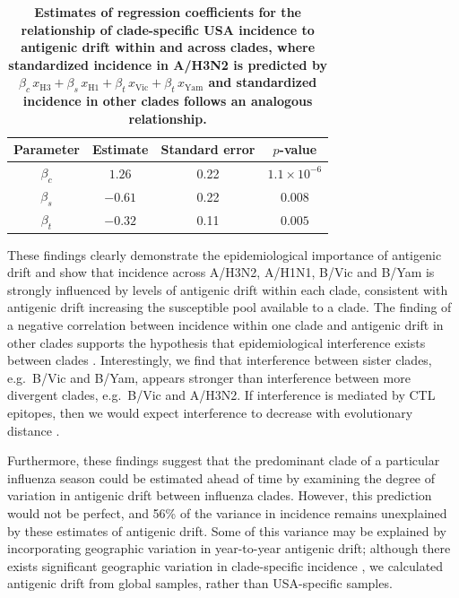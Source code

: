 \documentclass[11pt,oneside,letterpaper]{article}
\newcommand{\bwithin}{\beta_c}		%
\newcommand{\bsister}{\beta_s}		%
\newcommand{\bother}{\beta_t}			%
\newcommand{\driftclade}[1]{x_\mathrm{#1}}
\begin{document}
\begin{table}[h]
	\centering
	\caption{\textbf{Estimates of regression coefficients for the relationship of clade-specific USA incidence to antigenic drift within and across clades, where standardized incidence in A/H3N2 is predicted by $\bwithin \, \driftclade{H3} + \bsister \, \driftclade{H1} + \bother \, \driftclade{Vic} + \bother \, \driftclade{Yam}$ and standardized incidence in other clades follows an analogous relationship.}}
	\label{interferencetable}	
	\begin{tabular}{ c c c c } 
	\hline
	Parameter	&	Estimate	&	Standard error 	& 	$p$-value \\
	\hline		
	$\bwithin$	&	$1.26$		&	0.22			&	$1.1 \times 10^{-6}$ \\
	$\bsister$	&	$-0.61$		&	0.22			&	$0.008$ \\
	$\bother$	&	$-0.32$		&	0.11			&	$0.005$ \\
	\hline
	\end{tabular}
\end{table}

These findings clearly demonstrate the epidemiological importance of antigenic drift and show that incidence across  A/H3N2, A/H1N1, B/Vic and B/Yam is strongly influenced by levels of antigenic drift within each clade, consistent with antigenic drift increasing the susceptible pool available to a clade.
The finding of a negative correlation between incidence within one clade and antigenic drift in other clades supports the hypothesis that epidemiological interference exists between clades \cite{Ferguson03, Goldstein11}.
Interestingly, we find that interference between sister clades, e.g.\ B/Vic and B/Yam, appears stronger than interference between more divergent clades, e.g.\ B/Vic and A/H3N2.
If interference is mediated by CTL epitopes, then we would expect interference to decrease with evolutionary distance \cite{Voeten00}.

Furthermore, these findings suggest that the predominant clade of a particular influenza season could be estimated ahead of time by examining the degree of variation in antigenic drift between influenza clades.
However, this prediction would not be perfect, and 56\% of the variance in incidence remains unexplained by these estimates of antigenic drift.
Some of this variance may be explained by incorporating geographic variation in year-to-year antigenic drift; although there exists significant geographic variation in clade-specific incidence \cite{Finkelman07}, we calculated antigenic drift from global samples, rather than USA-specific samples.
\end{document}
